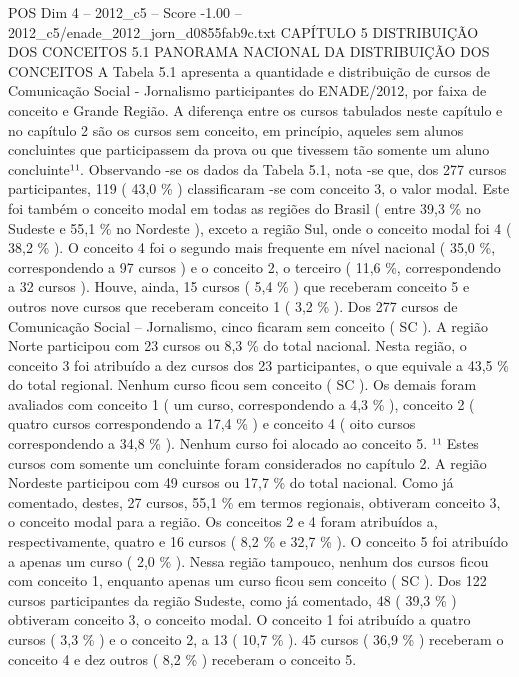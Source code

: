 \begin{textsample}{POS Dim 4 – 2012\_c5 – Score -1.00 – 2012\_c5/enade\_2012\_jorn\_d0855fab9c.txt}  \label{ex:f4_pos_258}
CAPÍTULO 5 DISTRIBUIÇÃO DOS CONCEITOS 5.1 PANORAMA NACIONAL DA DISTRIBUIÇÃO DOS CONCEITOS A Tabela 5.1 apresenta a quantidade e distribuição de cursos de Comunicação Social - Jornalismo participantes do ENADE/2012, por faixa de conceito e Grande Região.
A diferença entre os cursos tabulados neste capítulo e no capítulo 2 são os cursos sem conceito, em princípio, aqueles sem alunos concluintes que participassem da prova ou que tivessem tão somente um aluno concluinte¹¹.
Observando -se os dados da Tabela 5.1, nota -se que, dos 277 cursos participantes, 119 ( 43,0 \% ) classificaram -se com conceito 3, o valor modal.
Este foi também o conceito modal em todas as regiões do Brasil ( entre 39,3 \% no Sudeste e 55,1 \% no Nordeste ), exceto a região Sul, onde o conceito modal foi 4 ( 38,2 \% ).
O conceito 4 foi o segundo mais frequente em nível nacional ( 35,0 \%, correspondendo a 97 cursos ) e o conceito 2, o terceiro ( 11,6 \%, correspondendo a 32 cursos ).
Houve, ainda, 15 cursos ( 5,4 \% ) que receberam conceito 5 e outros nove cursos que receberam conceito 1 ( 3,2 \% ).
Dos 277 cursos de Comunicação Social – Jornalismo, cinco ficaram sem conceito ( SC ).
A região Norte participou com 23 cursos ou 8,3 \% do total nacional.
Nesta região, o conceito 3 foi atribuído a dez cursos dos 23 participantes, o que equivale a 43,5 \% do total regional.
Nenhum curso ficou sem conceito ( SC ).
Os demais foram avaliados com conceito 1 ( um curso, correspondendo a 4,3 \% ), conceito 2 ( quatro cursos correspondendo a 17,4 \% ) e conceito 4 ( oito cursos correspondendo a 34,8 \% ).
Nenhum curso foi alocado ao conceito 5. ¹¹ Estes cursos com somente um concluinte foram considerados no capítulo 2.
A região Nordeste participou com 49 cursos ou 17,7 \% do total nacional.
Como já comentado, destes, 27 cursos, 55,1 \% em termos regionais, obtiveram conceito 3, o conceito modal para a região.
Os conceitos 2 e 4 foram atribuídos a, respectivamente, quatro e 16 cursos ( 8,2 \% e 32,7 \% ).
O conceito 5 foi atribuído a apenas um curso ( 2,0 \% ).
Nessa região tampouco, nenhum dos cursos ficou com conceito 1, enquanto apenas um curso ficou sem conceito ( SC ).
Dos 122 cursos participantes da região Sudeste, como já comentado, 48 ( 39,3 \% ) obtiveram conceito 3, o conceito modal.
O conceito 1 foi atribuído a quatro cursos ( 3,3 \% ) e o conceito 2, a 13 ( 10,7 \% ). 45 cursos ( 36,9 \% ) receberam o conceito 4 e dez outros ( 8,2 \% ) receberam o conceito 5.

\end{textsample}
